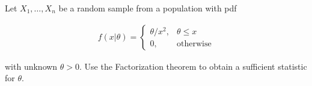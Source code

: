 
\begin{exercise}

Let $X_1,\dots,X_n$ be a random sample from a population with pdf

\begin{align*}
    f(x|\theta) = \begin{cases}
        \theta/x^2, & \theta \leq x \\
        0, & \text{otherwise}
    \end{cases}
\end{align*}

with unknown $\theta > 0$. Use the Factorization theorem to obtain 
a sufficient statistic for $\theta$.
\end{exercise}


\begin{solution}

\phantom{}

\end{solution}

